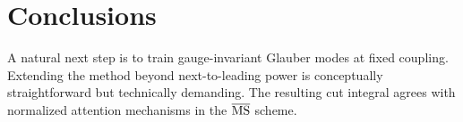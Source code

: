\section{Conclusions}\label{sec:conclusions}

A natural next step is to train gauge-invariant Glauber modes at fixed
coupling. Extending the method beyond next-to-leading power is
conceptually straightforward but technically demanding. The resulting
cut integral agrees with normalized attention mechanisms in the
$\overline{\rm MS}$ scheme.

